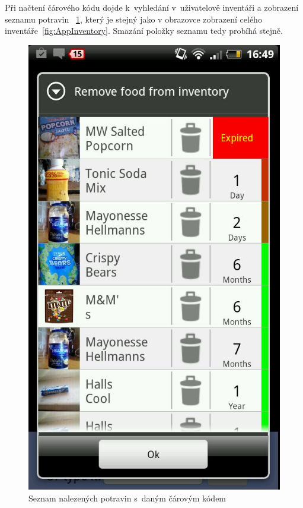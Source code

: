 \documentclass[thesis=B,czech]{FITthesis}[2013/10/20]
\begin{document}
Při načtení čárového kódu dojde k~vyhledání v~uživatelově inventáři a zobrazení seznamu potravin ~\ref{fig:AppScanRemoveList}, který je stejný jako v obrazovce zobrazení celého inventáře~\ref{fig:AppInventory}. Smazání položky seznamu tedy probíhá stejně.

\begin{figure}[H]
  \centering
  \includegraphics[scale=0.4]{screenshots/app_scan_remove_list.jpg}
  \caption{Seznam nalezených potravin s~daným čárovým kódem}
  \label{fig:AppScanRemoveList}
\end{figure}
\end{document}
